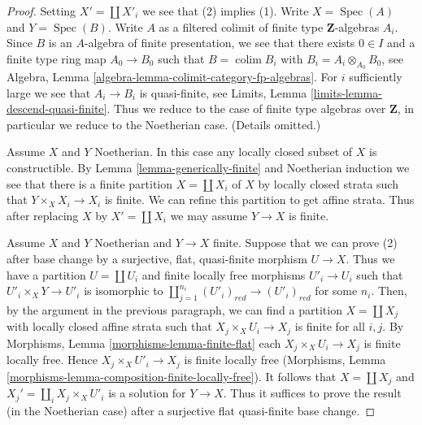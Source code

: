 \documentclass[10pt,a4paper]{amsart}
\theoremstyle{plain}
\theoremstyle{definition}
\theoremstyle{remark}
\numberwithin{equation}{subsection}
\def\colim{\mathop{\mathrm{colim}}\nolimits}
\def\Spec{\mathop{\mathrm{Spec}}}
\begin{document}
\begin{proof}
Setting $X' = \coprod X'_i$ we see that (2) implies (1).
Write $X = \Spec(A)$ and $Y = \Spec(B)$. Write $A$ as a filtered colimit
of finite type $\mathbf{Z}$-algebras $A_i$. Since $B$ is an $A$-algebra of
finite presentation, we see that there exists $0 \in I$ and a
finite type ring map $A_0 \to B_0$ such that $B = \colim B_i$ with
$B_i = A_i \otimes_{A_0} B_0$, see
Algebra, Lemma \ref{algebra-lemma-colimit-category-fp-algebras}.
For $i$ sufficiently large we see that $A_i \to B_i$ is
quasi-finite, see Limits, Lemma \ref{limits-lemma-descend-quasi-finite}.
Thus we reduce to the case of finite type algebras over $\mathbf{Z}$,
in particular we reduce to the Noetherian case. (Details omitted.)

\medskip\noindent
Assume $X$ and $Y$ Noetherian. In this case any locally closed
subset of $X$ is constructible. By Lemma \ref{lemma-generically-finite}
and Noetherian induction we see that
there is a finite partition $X = \coprod X_i$ of $X$
by locally closed strata such that $Y \times_X X_i \to X_i$ is finite.
We can refine this partition to get affine strata.
Thus after replacing $X$ by $X' = \coprod X_i$ we may assume
$Y \to X$ is finite.

\medskip\noindent
Assume $X$ and $Y$ Noetherian and $Y \to X$ finite.
Suppose that we can prove (2) after base change by a surjective,
flat, quasi-finite morphism $U \to X$. Thus we have a partition
$U = \coprod U_i$ and finite locally free morphisms $U'_i \to U_i$
such that $U'_i \times_X Y \to U'_i$ is isomorphic to
$\coprod_{j = 1}^{n_i} (U'_i)_{red} \to (U'_i)_{red}$ for some $n_i$.
Then, by the argument in the previous paragraph, we can find a
partition $X = \coprod X_j$ with locally closed affine strata such that
$X_j \times_X U_i \to X_j$ is finite for all $i, j$. By
Morphisms, Lemma \ref{morphisms-lemma-finite-flat}
each $X_j \times_X U_i \to X_j$ is finite locally free.
Hence $X_j \times_X U'_i \to X_j$ is finite locally free
(Morphisms, Lemma \ref{morphisms-lemma-composition-finite-locally-free}).
It follows that $X = \coprod X_j$ and $X_j' = \coprod_i X_j \times_X U'_i$
is a solution for $Y \to X$. Thus it suffices to prove
the result (in the Noetherian case) after a surjective flat quasi-finite
base change.


\end{proof}
\end{document}

